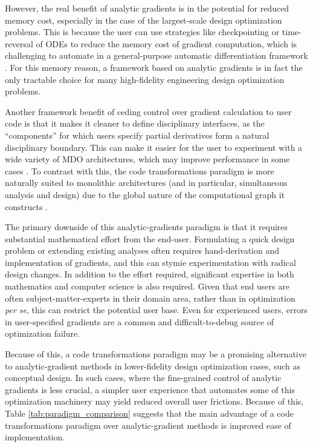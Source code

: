 However, the real benefit of analytic gradients is in the potential for reduced memory cost, especially in the case of the largest-scale design optimization problems. This is because the user can use strategies like checkpointing or time-reversal of ODEs to reduce the memory cost of gradient computation, which is challenging to automate in a general-purpose automatic differentiation framework \cite{chen2018neural, rackauckas_direct_2022, griewank_algorithm_2000}. For this memory reason, a framework based on analytic gradients is in fact the only tractable choice for many high-fidelity engineering design optimization problems.

Another framework benefit of ceding control over gradient calculation to user code is that it makes it cleaner to define disciplinary interfaces, as the ``components'' for which users specify partial derivatives form a natural disciplinary boundary. This can make it easier for the user to experiment with a wide variety of MDO architectures, which may improve performance in some cases \cite{martins_multidisciplinary_2013}. To contrast with this, the code transformations paradigm is more naturally suited to monolithic architectures (and in particular, simultaneous analysis and design) due to the global nature of the computational graph it constructs \cite{ma_modelingtoolkit_2021, haftka_simultaneous_1985}.

The primary downside of this analytic-gradients paradigm is that it requires substantial mathematical effort from the end-user. Formulating a quick design problem or extending existing analyses often requires hand-derivation and implementation of gradients, and this can stymie experimentation with radical design changes. In addition to the effort required, significant expertise in both mathematics and computer science is also required. Given that end users are often subject-matter-experts in their domain area, rather than in optimization \emph{per se}, this can restrict the potential user base. Even for experienced users, errors in user-specified gradients are a common and difficult-to-debug source of optimization failure.

Because of this, a code transformations paradigm may be a promising alternative to analytic-gradient methods in lower-fidelity design optimization cases, such as conceptual design. In such cases, where the fine-grained control of analytic gradients is less crucial, a simpler user experience that automates some of this optimization machinery may yield reduced overall user frictions. Because of this, Table \ref{tab:paradigm_comparison} suggests that the main advantage of a code transformations paradigm over analytic-gradient methods is improved ease of implementation.

